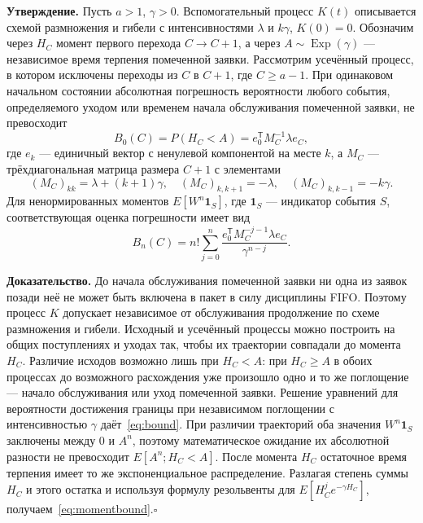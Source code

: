 \noindent\textbf{Утверждение.}
Пусть $a>1$, $\gamma>0$. Вспомогательный процесс $K(t)$ описывается схемой размножения и гибели с интенсивностями $\lambda$ и $k\gamma$, $K(0)=0$. Обозначим через $H_C$ момент первого перехода $C\to C+1$, а через $A\sim\operatorname{Exp}(\gamma)$ --- независимое время терпения помеченной заявки. Рассмотрим усечённый процесс, в котором исключены переходы из $C$ в $C+1$, где $C\geq a-1$. При одинаковом начальном состоянии абсолютная погрешность вероятности любого события, определяемого уходом или временем начала обслуживания помеченной заявки, не превосходит
\begin{equation}\label{eq:bound}
 B_0(C)=P(H_C<A)=e_0^{\mathsf T}M_C^{-1}\lambda e_C,
\end{equation}
где $e_k$ --- единичный вектор с ненулевой компонентой на месте $k$, а $M_C$ --- трёхдиагональная матрица размера $C+1$ с элементами
\begin{equation}
 (M_C)_{kk}=\lambda+(k+1)\gamma,\quad
 (M_C)_{k,k+1}=-\lambda,\quad (M_C)_{k,k-1}=-k\gamma.
\end{equation}
Для ненормированных моментов $E[W^n\mathbf1_S]$, где $\mathbf1_S$ --- индикатор события $S$, соответствующая оценка погрешности имеет вид
\begin{equation}\label{eq:momentbound}
 B_n(C)=n!\sum_{j=0}^{n}
 \frac{e_0^{\mathsf T}M_C^{-j-1}\lambda e_C}{\gamma^{n-j}}.
\end{equation}

\noindent\textbf{Доказательство.}
До начала обслуживания помеченной заявки ни одна из заявок позади неё не может быть включена в пакет в силу дисциплины FIFO. Поэтому процесс $K$ допускает независимое от обслуживания продолжение по схеме размножения и гибели. Исходный и усечённый процессы можно построить на общих поступлениях и уходах так, чтобы их траектории совпадали до момента $H_C$. Различие исходов возможно лишь при $H_C<A$: при $H_C\geq A$ в обоих процессах до возможного расхождения уже произошло одно и то же поглощение --- начало обслуживания или уход помеченной заявки. Решение уравнений для вероятности достижения границы при независимом поглощении с интенсивностью $\gamma$ даёт~\eqref{eq:bound}. При различии траекторий оба значения $W^n\mathbf1_S$ заключены между $0$ и $A^n$, поэтому математическое ожидание их абсолютной разности не превосходит $E[A^n;H_C<A]$. После момента $H_C$ остаточное время терпения имеет то же экспоненциальное распределение. Разлагая степень суммы $H_C$ и этого остатка и используя формулу резольвенты для $E[H_C^j e^{-\gamma H_C}]$, получаем~\eqref{eq:momentbound}.\hfill$\square$

